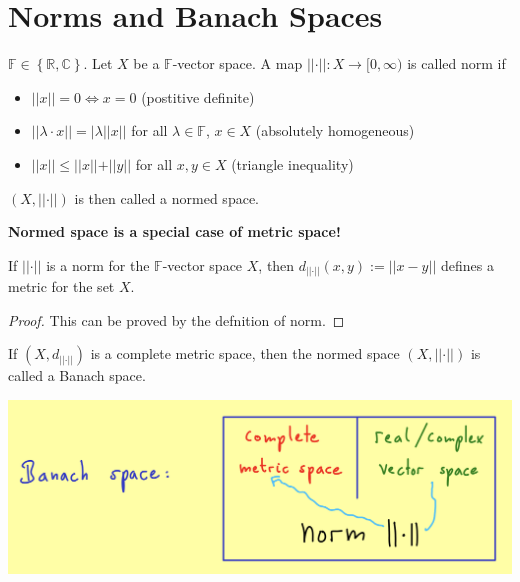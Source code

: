 \documentclass[../../note.tex]{subfiles}
\begin{document}
\section{Norms and Banach Spaces}
\begin{definition}[Norm]
    \label{def: norm}
    $\mathbb{F} \in \left\{\mathbb{R}, \mathbb{C}\right\}$. Let $X$ be a $\mathbb{F}$-vector space. A map $\vert \vert \cdot \vert \vert: X \rightarrow [0, \infty)$ is called norm if 
    \begin{itemize}
        \item $\vert \vert x \vert \vert = 0 \Longleftrightarrow x = 0$ (postitive definite) 
        \item $\vert \vert \lambda \cdot x \vert \vert = \vert \lambda \vert \vert x \vert \vert $ for all $\lambda \in \mathbb{F}$, $x \in X$ (absolutely homogeneous) 
        \item $\vert \vert x \vert \vert \leq \vert \vert x \vert \vert + \vert \vert y \vert \vert$ for all $x,y \in X$ (triangle inequality)
    \end{itemize}
\end{definition}

\begin{definition}
    $(X, \vert \vert \cdot \vert \vert)$ is then called a normed space.
\end{definition}

\textbf{Normed space is a special case of metric space!}

\begin{lemma}
    If $\vert \vert \cdot \vert \vert$ is a norm for the $\mathbb{F}$-vector space $X$, then $d_{\vert \vert \cdot \vert \vert}(x,y):= \vert \vert x-y \vert \vert$ defines a metric for the set $X$.
\end{lemma}
\begin{proof}
    This can be proved by the defnition of norm.
\end{proof}

\begin{definition}
    If $(X, d_{\vert \vert \cdot \vert \vert})$ is a complete metric space, then the normed space $(X, \vert \vert \cdot \vert \vert)$ is called a Banach space.
\end{definition}

\includegraphics[scale = 0.6]{../figures/banach space.png}
\end{document}
